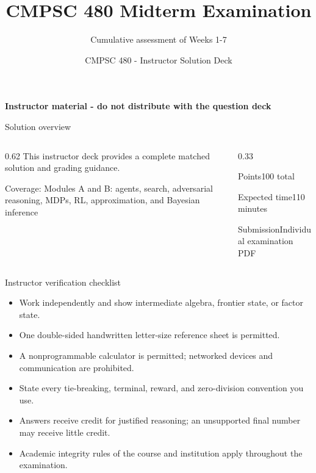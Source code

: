 \documentclass[aspectratio=169,11pt]{beamer}
\title[Midterm Solutions]{CMPSC 480 Midterm Examination}
\subtitle{Cumulative assessment of Weeks 1-7}
\author{CMPSC 480 - Instructor Solution Deck}
\date{}
\begin{document}
\begin{frame}
  \titlepage
\vspace{-0.35cm}
\begin{center}
\color{coursered}\bfseries Instructor material - do not distribute with the question deck
\end{center}
\end{frame}

\begin{frame}{Solution overview}
\begin{columns}[T,onlytextwidth]
\begin{column}{0.62\textwidth}
\Large This instructor deck provides a complete matched solution and grading guidance.

\vspace{0.35cm}
\normalsize
Coverage: Modules A and B: agents, search, adversarial reasoning, MDPs, RL, approximation, and Bayesian inference
\end{column}
\begin{column}{0.33\textwidth}
\begin{block}{Points}100 total\end{block}
\begin{block}{Expected time}110 minutes\end{block}
\begin{block}{Submission}Individual examination PDF\end{block}
\end{column}
\end{columns}
\end{frame}

\begin{frame}{Instructor verification checklist}
\small
\begin{itemize}
  \item Work independently and show intermediate algebra, frontier state, or factor state.
  \item One double-sided handwritten letter-size reference sheet is permitted.
  \item A nonprogrammable calculator is permitted; networked devices and communication are prohibited.
  \item State every tie-breaking, terminal, reward, and zero-division convention you use.
  \item Answers receive credit for justified reasoning; an unsupported final number may receive little credit.
  \item Academic integrity rules of the course and institution apply throughout the examination.
\end{itemize}
\end{frame}
\end{document}
